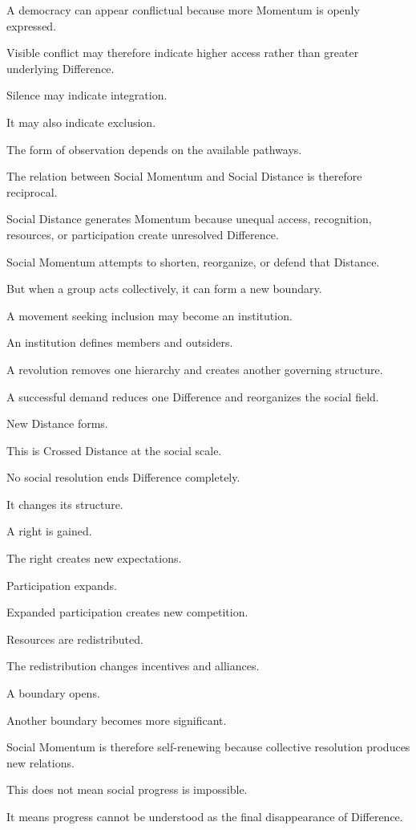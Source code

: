 A democracy can appear conflictual because more Momentum is openly expressed.

Visible conflict may therefore indicate higher access rather than greater underlying Difference.

Silence may indicate integration.

It may also indicate exclusion.

The form of observation depends on the available pathways.

The relation between Social Momentum and Social Distance is therefore reciprocal.

Social Distance generates Momentum because unequal access, recognition, resources, or participation create unresolved Difference.

Social Momentum attempts to shorten, reorganize, or defend that Distance.

But when a group acts collectively, it can form a new boundary.

A movement seeking inclusion may become an institution.

An institution defines members and outsiders.

A revolution removes one hierarchy and creates another governing structure.

A successful demand reduces one Difference and reorganizes the social field.

New Distance forms.

This is Crossed Distance at the social scale.

No social resolution ends Difference completely.

It changes its structure.

A right is gained.

The right creates new expectations.

Participation expands.

Expanded participation creates new competition.

Resources are redistributed.

The redistribution changes incentives and alliances.

A boundary opens.

Another boundary becomes more significant.

Social Momentum is therefore self-renewing because collective resolution produces new relations.

This does not mean social progress is impossible.

It means progress cannot be understood as the final disappearance of Difference.

